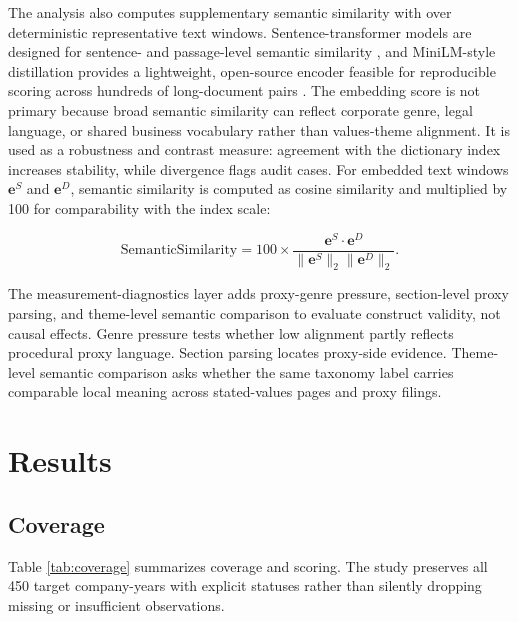 \documentclass[11pt]{article}
\begin{document}
The analysis also computes supplementary semantic similarity with
 over deterministic representative text windows.
Sentence-transformer models are designed for sentence- and passage-level semantic similarity
\cite{reimers2019}, and MiniLM-style distillation provides a lightweight, open-source encoder
feasible for reproducible scoring across hundreds of long-document pairs \cite{wang2020}. The
embedding score is not primary because broad semantic similarity can reflect corporate genre, legal
language, or shared business vocabulary rather than values-theme alignment. It is used as a
robustness and contrast measure: agreement with the dictionary index increases stability, while
divergence flags audit cases.
For embedded text windows $\mathbf{e}^{S}$ and $\mathbf{e}^{D}$, semantic similarity is computed as
cosine similarity and multiplied by 100 for comparability with the index scale:

\begin{equation}
\mathrm{SemanticSimilarity} =
100 \times
\frac{\mathbf{e}^{S}\cdot \mathbf{e}^{D}}
{\lVert \mathbf{e}^{S}\rVert_2 \lVert \mathbf{e}^{D}\rVert_2}.
\end{equation}

The measurement-diagnostics layer adds proxy-genre pressure, section-level proxy parsing, and
theme-level semantic comparison to evaluate construct validity, not causal effects. Genre pressure
tests whether low alignment partly reflects procedural proxy language. Section parsing locates
proxy-side evidence. Theme-level semantic comparison asks whether the same taxonomy label carries
comparable local meaning across stated-values pages and proxy filings.

\section{Results}

\subsection{Coverage}

Table \ref{tab:coverage} summarizes coverage and scoring. The study preserves all 450 target
company-years with explicit statuses rather than silently dropping missing or insufficient
observations.
\end{document}
